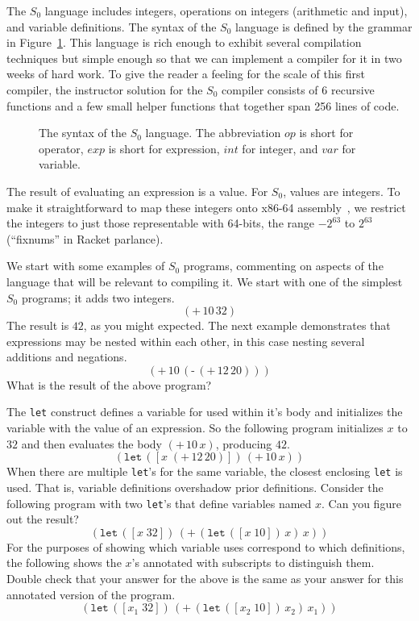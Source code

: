 \documentclass[12pt]{book}
\newcommand{\itm}[1]{\ensuremath{\mathit{#1}}}
\newcommand{\Exp}{\itm{exp}}
\newcommand{\Int}{\itm{int}}
\newcommand{\Var}{\itm{var}}
\newcommand{\Op}{\itm{op}}
\newcommand{\key}[1]{\texttt{#1}}
\newcommand{\UNIOP}[2]{(\key{#1}\,#2)}
\newcommand{\BINOP}[3]{(\key{#1}\,#2\,#3)}
\newcommand{\LET}[3]{(\key{let}\,([#1\;#2])\,#3)}
\begin{document}
The $S_0$ language includes integers, operations on integers
(arithmetic and input), and variable definitions.  The syntax of the
$S_0$ language is defined by the grammar in
Figure~\ref{fig:s0-syntax}. This language is rich enough to exhibit
several compilation techniques but simple enough so that we can
implement a compiler for it in two weeks of hard work.  To give the
reader a feeling for the scale of this first compiler, the instructor
solution for the $S_0$ compiler consists of 6 recursive functions and
a few small helper functions that together span 256 lines of code.

\begin{figure}[btp]
\centering
\fbox{
\begin{minipage}{0.85\textwidth}
\[
\begin{array}{lcl}
  \Op  &::=& \key{+} \mid \key{-} \mid \key{*} \mid \key{read} \\
  \Exp &::=& \Int \mid (\Op \; \Exp^{*}) \mid \Var \mid \LET{\Var}{\Exp}{\Exp}
\end{array}
\]
\end{minipage}
}
\caption{The syntax of the $S_0$ language. The abbreviation \Op{} is
  short for operator, \Exp{} is short for expression, \Int{} for integer,
  and \Var{} for variable.}
\label{fig:s0-syntax}
\end{figure}

The result of evaluating an expression is a value.  For $S_0$, values
are integers. To make it straightforward to map these integers onto
x86-64 assembly~\citep{Matz:2013aa}, we restrict the integers to just
those representable with 64-bits, the range $-2^{63}$ to $2^{63}$
(``fixnums'' in Racket parlance).

We start with some examples of $S_0$ programs, commenting on aspects
of the language that will be relevant to compiling it.  We start with
one of the simplest $S_0$ programs; it adds two integers.
\[
\BINOP{+}{10}{32}
\]
The result is $42$, as you might expected. 
%
The next example demonstrates that expressions may be nested within
each other, in this case nesting several additions and negations.
\[
\BINOP{+}{10}{ \UNIOP{-}{ \BINOP{+}{12}{20} } }
\]
What is the result of the above program?

The \key{let} construct defines a variable for used within it's body
and initializes the variable with the value of an expression.  So the
following program initializes $x$ to $32$ and then evaluates the body
$\BINOP{+}{10}{x}$, producing $42$.
\[
\LET{x}{ \BINOP{+}{12}{20} }{ \BINOP{+}{10}{x} } 
\]
When there are multiple \key{let}'s for the same variable, the closest
enclosing \key{let} is used. That is, variable definitions overshadow
prior definitions. Consider the following program with two \key{let}'s
that define variables named $x$. Can you figure out the result?
\[
\LET{x}{32}{ \BINOP{+}{ \LET{x}{10}{x} }{ x } }
\]
For the purposes of showing which variable uses correspond to which
definitions, the following shows the $x$'s annotated with subscripts
to distinguish them. Double check that your answer for the above is
the same as your answer for this annotated version of the program.
\[
\LET{x_1}{32}{ \BINOP{+}{ \LET{x_2}{10}{x_2} }{ x_1 } }
\]
\end{document}
